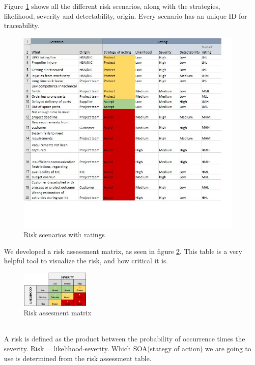 Figure \ref{fig:risk} shows all the different risk scenarios, along with the strategies, likelihood, severity and detectability, origin. Every scenario has an unique ID for traceability.
\begin{figure}[H]
    \centering
    \includegraphics[width = 1.0\textwidth]{VAPIQ-PICTURES/RiskScenarios.jpg}
    \caption{Risk scenarios with ratings}
    \label{fig:risk}
\end{figure}
\noindent We developed a risk assessment matrix, as seen in figure \ref{AssRisk}. This table is a very helpful tool to visualize the risk, and how critical it is.
\begin{figure}[H]
    \centering
    \includegraphics[width = 0.3\textwidth]{VAPIQ-PICTURES/Riskmatrix.jpg}
    \caption{Risk assesment matrix}
    \label{AssRisk}
\end{figure} \\
\noindent
A risk is defined as the product between the probability of occurrence times the severity. Risk = likelihood$\cdot$severity. Which SOA(stategy of action) we are going to use is determined from the risk assessment table.
\newline \newline
